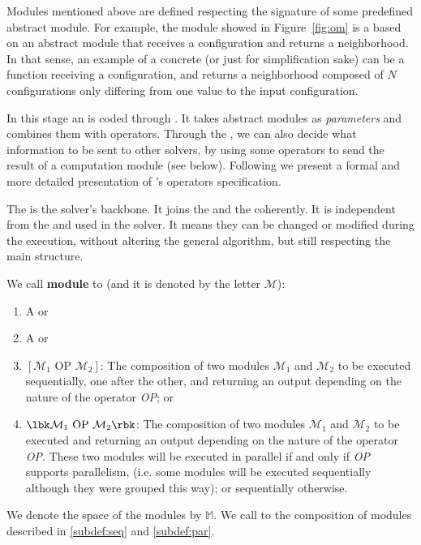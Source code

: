 Modules mentioned above are defined respecting the signature of some predefined abstract module. For example, the module showed in Figure~\ref{fig:om} is a \om{} based on an abstract module that receives a configuration and returns a neighborhood. In that sense, an example of a concrete \om{} (or just \om{} for simplification sake) can be a function receiving a configuration, and returns a neighborhood composed of $N$ configurations only differing from one value to the input configuration.

In this stage an \as{} is coded through \posl{}. It takes abstract modules as {\it parameters} and combines them with operators. Through the \as, we can also decide what information to be sent to other solvers, by using some operators to send the result of a computation module (see below). Following we present a formal and more detailed presentation of \posl{}'s operators specification. 


The \as{} is the solver's backbone. It joins the \oms{} and the \opchs{} coherently. It is independent from the \oms{} and \opchs{} used in the solver. It means they can be changed or modified during the execution, without altering the general algorithm, but still respecting the main structure. 

\begin{definition}
	\label{def:module}
We call {\bf module} to (and it is denoted by the letter $\mathcal{M}$):
\begin{enumerate}\renewcommand{\labelitemi}{\scriptsize$\blacksquare$}
\item A \om{} or
\item A \opch{} or
\item $\left[\mathcal{M}_1 \text{ OP } \mathcal{M}_2\right]$: The composition of two modules $\mathcal{M}_1$ and $\mathcal{M}_2$ to be executed sequentially, one after the other, and returning an output depending on the nature of the operator \emph{OP}; or\label{subdef:seq}
\item $\lbk\mathcal{M}_1 \text{ OP } \mathcal{M}_2\rbk$: The composition of two modules $\mathcal{M}_1$ and $\mathcal{M}_2$ to be executed and returning an output depending on the nature of the operator \emph{OP}. These two modules will be executed in parallel if and only if \emph{OP} supports parallelism, (i.e. some modules will be executed sequentially although they were grouped this way); or sequentially otherwise.\label{subdef:par}
\end{enumerate}
We denote the space of the modules by $\mathbb{M}$.
We call \cms{} to the composition of modules described in \ref{subdef:seq} and \ref{subdef:par}.
\end{definition}

